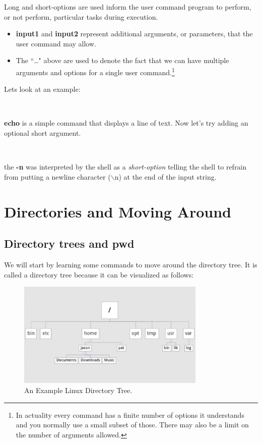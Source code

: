 \documentclass[oneside]{book}
\newcommand{\commandline}[1]{\begin{center} \colorbox{Dark}{\textcolor{white}{#1}} \end{center}}
\begin{document}
Long and short-options are used inform the user command program to perform, or not perform, particular tasks during execution.

\begin{itemize}
    \item \textbf{input1} and \textbf{input2} represent additional arguments, or parameters, that the user command may allow.
    \item The ``\dots" above are used to denote the fact that we can have multiple arguments and options for a single user command.\footnote{In actuality every command has a finite number of options it understands and you normally use a small subset of those. There may also be a limit on the number of arguments allowed.}
\end{itemize}
   
Lets look at an example:
\commandline{echo hello world}

\textbf{echo} is a simple command that displays a line of text. Now let's try adding an optional short argument.

\commandline{echo -n hello world}

the \textbf{-n} was interpreted by the shell as a \textit{short-option} telling the shell to refrain from putting a newline character ($\backslash$n) at the end of the input string.

\section{Directories and Moving Around}

\subsection{Directory trees and pwd}
We will start by learning some commands to move around the directory tree. It is called a directory tree because it can be visualized as follows:

\begin{figure}[H]
	\centering
	\label{tab:directory_tree}
	\includegraphics[width=90mm]{linux-directory-tree.jpg}
	\caption{An Example Linux Directory Tree.} 
\end{figure}
\end{document}
